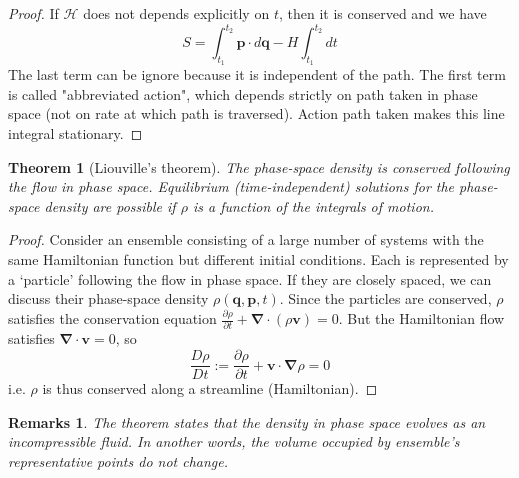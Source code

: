 \documentclass[a4paper]{article}
\newtheorem{remarks}{Remarks}[section]
\newtheorem{thm}{Theorem}[section]
\theoremstyle{new}
\begin{document}
\begin{proof}
 If $\mathcal{H}$ does not depends explicitly on $t$, then it is conserved and we have 
$$S=\int_{t_1}^{t_2}\mathbf{p}\cdot d\mathbf{q}-H\int_{t_1}^{t_2}dt$$
The last term can be ignore because it is independent of the path. The first term is called "abbreviated action", which depends strictly on path taken in phase space (not on rate at which path is traversed). Action path taken makes this line integral stationary.
\end{proof}
\begin{thm}[Liouville's theorem]
The phase-space density is conserved following the flow in phase space. Equilibrium (time-independent) solutions for the phase-space density are possible if $\rho$ is a function of the integrals of motion. 
\end{thm}
\begin{proof}
Consider an ensemble consisting of a large number of systems with the same Hamiltonian function but different initial conditions. Each is represented by a `particle' following the flow in phase space. If they are closely spaced, we can discuss their phase-space density $\rho(\mathbf{q},\mathbf{p},t)$. Since the particles are conserved, $\rho$ satisfies the conservation equation $\frac{\partial\rho}{\partial t}+\boldsymbol{\nabla}\cdot(\rho\mathbf{v})=0$. But the Hamiltonian flow satisfies $\boldsymbol{\nabla}\cdot\mathbf{v}=0$, so
$$\frac{D\rho}{Dt}:=\frac{\partial\rho}{\partial t}+\mathbf{v}\cdot\boldsymbol{\nabla}\rho=0$$
i.e. $\rho$ is thus conserved along a streamline (Hamiltonian).
\end{proof}
\begin{remarks}
The theorem states that the density in phase space evolves as an incompressible fluid. 
In another words, the volume occupied by ensemble's representative points do not change.
\end{remarks}
\newpage
\end{document}
